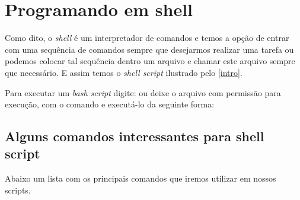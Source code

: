 \documentclass[11pt]{../classes/ifscarticle}
\begin{document}
\section{Programando em shell}

Como dito, o \textit{shell} é um interpretador de comandos e temos a opção de entrar com uma sequência de comandos sempre que desejarmos realizar uma tarefa ou podemos colocar tal sequência dentro um arquivo e chamar este arquivo sempre que necessário. E assim temos o \textit{shell script} ilustrado pelo \autoref{intro}.


\begin{tip}
	Para executar um \textit{bash script} digite:  ou deixe o arquivo com permissão para execução, com o comando  e executá-lo da seguinte forma: 
\end{tip}

\subsection{Alguns comandos interessantes para shell script}

Abaixo um lista com os principais comandos que iremos utilizar em nossos scripts.
\end{document}
